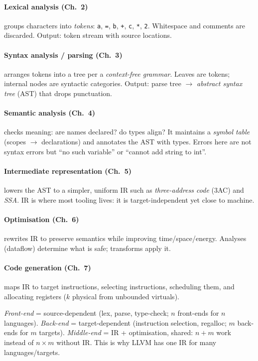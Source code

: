 \paragraph{Lexical analysis (Ch.~2)} groups characters into \emph{tokens}: \texttt{a}, \texttt{=}, \texttt{b}, \texttt{+}, \texttt{c}, \texttt{*}, \texttt{2}. Whitespace and comments are discarded. Output: token stream with source locations.

\paragraph{Syntax analysis / parsing (Ch.~3)} arranges tokens into a tree per a \emph{context-free grammar}. Leaves are tokens; internal nodes are syntactic categories. Output: parse tree $\to$ \emph{abstract syntax tree} (AST) that drops punctuation.

\paragraph{Semantic analysis (Ch.~4)} checks meaning: are names declared? do types align? It maintains a \emph{symbol table} (scopes $\to$ declarations) and annotates the AST with types. Errors here are not syntax errors but ``no such variable'' or ``cannot add string to int''.

\paragraph{Intermediate representation (Ch.~5)} lowers the AST to a simpler, uniform IR such as \emph{three-address code} (3AC) and \emph{SSA}. IR is where most tooling lives: it is target-independent yet close to machine.

\paragraph{Optimisation (Ch.~6)} rewrites IR to preserve semantics while improving time/space/energy. Analyses (dataflow) determine what is safe; transforms apply it.

\paragraph{Code generation (Ch.~7)} maps IR to target instructions, selecting instructions, scheduling them, and allocating registers ($k$ physical from unbounded virtuals).

\begin{definition}
\emph{Front-end} = source-dependent (lex, parse, type-check; $n$ front-ends for $n$ languages). \emph{Back-end} = target-dependent (instruction selection, regalloc; $m$ back-ends for $m$ targets). \emph{Middle-end} = IR + optimisation, shared: $n+m$ work instead of $n\times m$ without IR. This is why LLVM has one IR for many languages/targets.
\end{definition}

